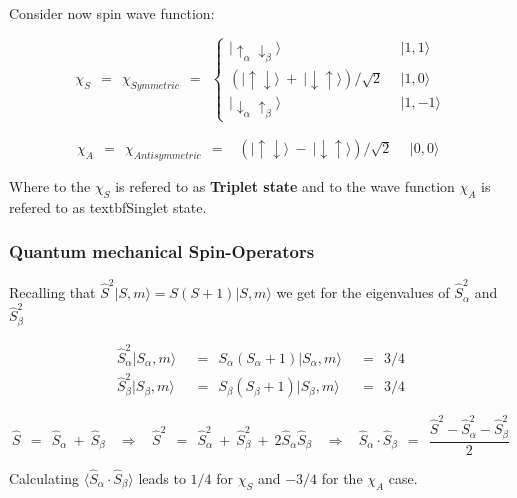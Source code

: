 \documentclass[10pt]{report}
\numberwithin{equation}{chapter}
\begin{document}
Consider now spin wave function:

\begin{equation}
  \chi_S ~~ = ~~ \chi_{Symmetric} ~~ = ~~ \left\{ 
  \begin{array}{ll}
    | \uparrow_\alpha \downarrow_\beta \rangle &~~ | 1,1 \rangle\\
    \left( | \uparrow \downarrow \rangle ~+~ | \downarrow \uparrow \rangle \right)/ \sqrt{2} &~~ | 1,0 \rangle\\
    | \downarrow_\alpha \uparrow_\beta \rangle &~~ | 1,-1 \rangle
  \end{array}\right.
\end{equation}

\begin{equation}
  \chi_A ~~ = ~~ \chi_{Antisymmetric} ~~ = ~~ 
  \begin{array}{ll}
    \left(| \uparrow \downarrow \rangle ~-~ | \downarrow \uparrow \rangle \right) / \sqrt{2} &~~ | 0,0 \rangle 
  \end{array}
\end{equation}

Where to the $\chi_S$ is refered to as \textbf{Triplet state} and to the wave function $\chi_A$ is refered to as textbf{Singlet state}.


\subsubsection{Quantum mechanical Spin-Operators}

Recalling that $\hat{S}^2 |S,m \rangle = S(S+1) | S,m \rangle$ we get for the eigenvalues of $\hat{S}^2_\alpha$ and $\hat{S}^2_\beta$

\begin{align}
  \hat{S}^2_\alpha |S_\alpha,m\rangle ~~ & = ~~ S_\alpha (S_\alpha+1) |S_\alpha,m\rangle ~~ & = ~~ 3/4\\
  \hat{S}^2_\beta  |S_\beta,m\rangle ~~ & = ~~ S_\beta  (S_\beta+1)  |S_\beta,m\rangle ~~ & = ~~ 3/4
\end{align}


\begin{equation}
  \hat{S} ~~=~~ \hat{S}_\alpha ~+~ \hat{S}_\beta ~~~~ \Rightarrow ~~~~ 
  \hat{S}^2 ~~=~~ \hat{S}^2_\alpha ~+~ \hat{S}^2_\beta ~+~ 2 \hat{S}_\alpha \hat{S}_\beta ~~~~ \Rightarrow ~~~~
  \hat{S}_\alpha \cdot \hat{S}_\beta ~~=~~ \frac{\hat{S}^2 - \hat{S}^2_\alpha - \hat{S}^2_\beta}{2}
\end{equation}


Calculating $\langle \hat{S}_\alpha \cdot \hat{S}_\beta \rangle$ leads to $1/4$ for $\chi_S$ and $-3/4$ for the $\chi_A$ case.
\end{document}
